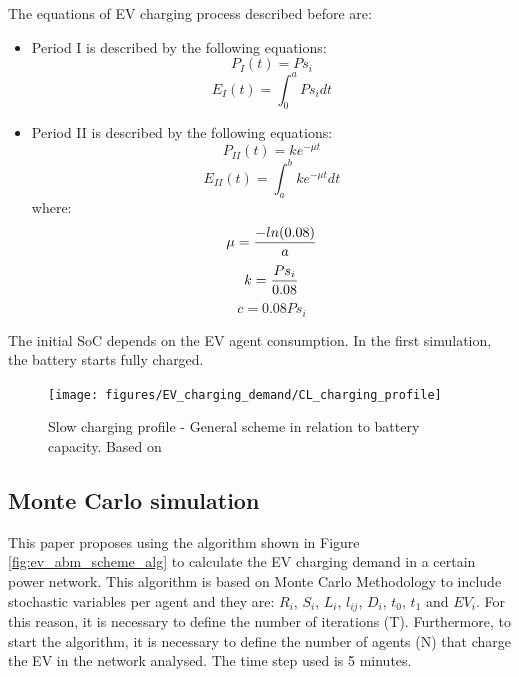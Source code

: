 \documentclass[a4paper,11pt,twoside,openright]{report}
\begin{document}
The equations of EV charging process described before are:
\begin{itemize}
	\item Period I is described by the following equations:
	\begin{equation} \label{eq:PI}
	P_{I}(t)=Ps_{i}
	\end{equation}
	\begin{equation} \label{eq:EI}
	E_{I}(t)=\int_{0}^{a} Ps_{i} dt
	\end{equation}
	\item Period II is described by the following equations:
	\begin{equation} 
	P_{II}(t) = k e^{-\mu t} \label{eq:expon}
	\end{equation}
	\begin{equation}
	E_{II}(t)=\int_{a}^{b} k e^{-\mu t}  dt
	\end{equation}
	where:
	\begin{equation} 
	\mu={-ln(0.08) \over a} \label{eq:mu}
	\end{equation}
	\begin{equation}
	k={Ps_{i} \over 0.08} \label{eq:k}
	\end{equation}
	\begin{equation}
	c=0.08 Ps_{i}
	\end{equation}
\end{itemize}

The initial SoC depends on the EV agent consumption. In the first simulation, the battery starts fully charged.

\begin{figure}[htbp]
	\centering
	\texttt{[image: figures/EV\_charging\_demand/CL\_charging\_profile]} 
	\caption{Slow charging profile - General scheme in relation to battery capacity. Based on \cite{Marra_baterias}
		\label{fig:SC_profile}}
\end{figure}

\subsection{Monte Carlo simulation} \label{sec:MonteCarlo}

This paper proposes using the algorithm shown in Figure \ref{fig:ev_abm_scheme_alg} to calculate the EV charging demand in a certain power network. This algorithm is based on Monte Carlo Methodology to include stochastic variables per agent and they are: $R_{i}$, $S_{i}$, $L_{i}$, $l_{ij}$, $D_{i}$, $t_{0}$, $t_{1}$ and $EV_{i}$. For this reason, it is necessary to define the number of iterations (T). Furthermore, to start the algorithm, it is necessary to define the number of agents (N) that charge the EV in the network analysed. The time step used is 5 minutes.
\end{document}
